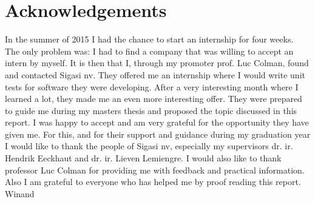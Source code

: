 \chapter*{Acknowledgements}
In the summer of 2015 I had the chance to start an internship for four weeks. The only problem was: I had to find a company that was willing to accept an intern by myself. It is then that I, through my promoter prof. Luc Colman, found and contacted Sigasi nv. They offered me an internship where I would write unit tests for software they were developing. After a very interesting month where I learned a lot, they made me an even more interesting offer. They were prepared to guide me during my masters thesis and proposed the topic discussed in this report. I was happy to accept and am very grateful for the opportunity they have given me. For this, and for their support and guidance during my graduation year I would like to thank the people of Sigasi nv, especially my supervisors dr. ir. Hendrik Eeckhaut and dr. ir. Lieven Lemiengre.
\npar
I would also like to thank professor Luc Colman for providing me with feedback and practical information. Also I am grateful to everyone who has helped me by proof reading this report.
\npar
Winand